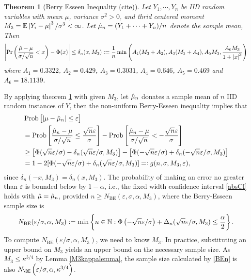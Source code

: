 \documentclass{iitthesis}
\newtheorem{theorem}{Theorem}[section]
\begin{document}
\begin{theorem}[Berry Esseen Inequality (cite)] \label{BEThm}
Let $Y_1,\cdots,Y_n$ be IID random variables with mean $\mu$, variance $\sigma^2 >0$, and thrid centered moment $M_3 = \mathbb{E}\left \lvert Y_i-\mu \right \rvert^3/\sigma^3 < \infty$. Let $\hat{\mu}_n = (Y_1+\cdots+Y_n)/n$ denote the sample mean, Then
\[
\left \lvert \Pr\left(\frac{\hat{\mu}-\mu}{\sigma/\sqrt{n}}<x\right)-\Phi(x) \right \rvert \leq \delta_n(x,M_3):=\frac{1}{n}\min\left( A_1(M_3+A_2),  A_3(M_3+A_4), A_5M_3, \frac{A_6M_3}{1+\left \lvert x \right \rvert^3}\right)
\]
where $A_1 = 0.3322$, $A_2 = 0.429$, $A_3=0.3031$, $A_4=0.646$, $A_5=0.469$ and $A_6=18.1139$.
\end{theorem}
By applying theorem \ref{BEThm} with given $M_3$, let $\hat{\mu}_n$ donates a sample mean of $n$ IID random instances of $Y$, then the non-uniform Berry-Esseen inequality implies that
\begin{align} 
&\operatorname{Prob}\left[\left \lvert \mu-\hat{\mu}_n \right \rvert  \le \varepsilon \right]\nonumber\\
&=\operatorname{Prob}\left[\frac{\hat{\mu}_n - \mu}{\sigma/\sqrt{n}} \le \frac{\sqrt{n}\varepsilon}{\sigma} \right]-\operatorname{Prob}\left[\frac{\hat{\mu}_n - \mu}{\sigma/\sqrt{n}} < -\frac{\sqrt{n}\varepsilon}{\sigma}\right] \nonumber \\ 
&\ge \left[\Phi(\sqrt{n}\varepsilon/\sigma)-\delta_n(\sqrt{n}\varepsilon/\sigma,M_3)\right] -\left[\Phi(-\sqrt{n}\varepsilon/\sigma) + \delta_n(-\sqrt{n}\varepsilon/\sigma,M_3)\right] \nonumber \\
&=1-2[\Phi(-\sqrt{n}\varepsilon/\sigma) + \delta_n(\sqrt{n}\varepsilon/\sigma,M_3)] =: g(n, \sigma, M_3, \varepsilon), \label{BEresult}
\end{align}
since $\delta_n(-x,M_3)=\delta_n(x,M_3)$.  The probability of
making an error no greater than $\varepsilon$ is bounded below by $1-\alpha$, i.e., the fixed width confidence interval \eqref{absCI} holds with $\hat{\mu}=\hat{\mu}_n$, provided $n \ge N_{\text{BE}}(\varepsilon,\sigma,\alpha,M_3)$, where the Berry-Esseen sample size is
\begin{equation}\label{BEn}
N_{\text{BE}}(\varepsilon/\sigma,\alpha,M_3) := \min  \left \{ n \in \mathbb{N} : \Phi\left(-\sqrt{n}\varepsilon/\sigma  \right)+\Delta_n(\sqrt{n}\varepsilon/\sigma,M_3)
\le \frac{\alpha}{2} \right \}.
\end{equation}
To compute $N_{\text{BE}}(\varepsilon/\sigma,\alpha,M_3)$, we need to know
$M_3$. In practice, substituting an upper bound on $M_3$ yields an upper bound on the necessary sample size.
As $M_3 \leq \kappa^{3/4}$ by Lemma \ref{M3kappalemma}, the sample size calculated by \eqref{BEn} is also $N_{\BE}\left(\varepsilon/\sigma,\alpha,\kappa^{3/4}\right) $.
\end{document}
